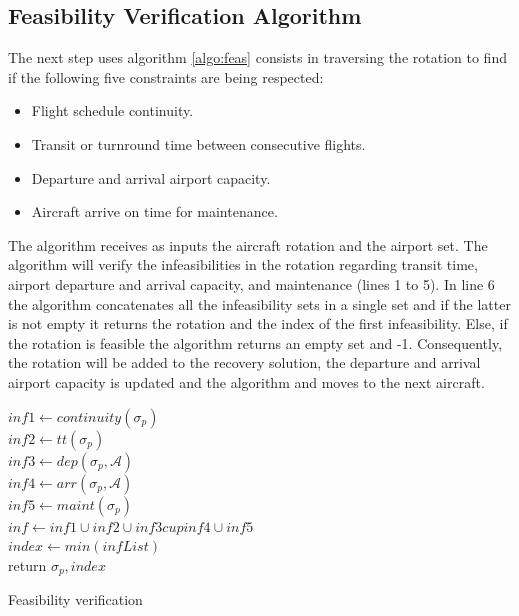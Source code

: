 \subsection{Feasibility Verification Algorithm} \label{sec:feasVer}
The next step uses algorithm \ref{algo:feas} consists in traversing the rotation to find  if the following five constraints are being respected:\\

\begin{itemize}
	\item Flight schedule continuity.\\
	\item Transit or turnround time between consecutive flights.\\
	\item Departure and arrival airport capacity.\\
	\item Aircraft arrive on time for maintenance.\\
\end{itemize}

The algorithm receives as inputs the aircraft rotation and the airport set. The algorithm will  verify the infeasibilities in the rotation regarding transit time, airport departure and arrival capacity, and maintenance (lines 1 to 5). In line 6 the algorithm concatenates all the infeasibility sets in a single set and if the latter is not empty it returns the rotation and the index of the first infeasibility. Else, if the rotation is feasible the algorithm returns an empty set and -1. Consequently, the rotation will be added to the recovery solution, the departure and arrival airport capacity is updated and the algorithm and moves to the next aircraft.



	\begin{algorithm}[H]
		\DontPrintSemicolon
		$inf1 \gets continuity(\sigma_p)$\\		%
		$inf2 \gets tt(\sigma_p)$\\ 		%
		$inf3 \gets dep(\sigma_p, \mathcal{A})$\\%
		$inf4 \gets arr(\sigma_p, \mathcal{A})$\\%
		$inf5 \gets maint(\sigma_p)$\\ %
		$inf \gets inf1 \cup inf2 \cup inf3 cup inf4 \cup inf5$\\
		{
			$index \gets min(infList)$\\
			return $\sigma_p, index$\\
		}
		\caption{Feasibility verification}
		\label{algo:feas}
	\end{algorithm}

